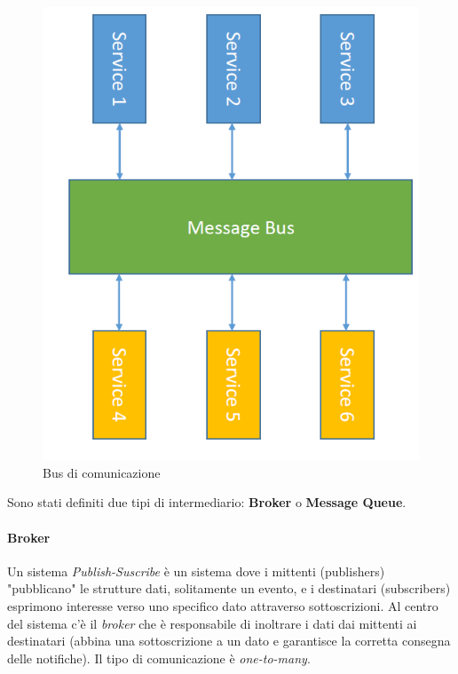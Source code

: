 \documentclass{article}
\begin{document}
\begin{figure}[H]
\centering
\includegraphics[scale=0.5]{img/Bus.PNG}
\caption{Bus di comunicazione}
\end{figure}

Sono stati definiti due tipi di intermediario: \textbf{Broker} o \textbf{Message Queue}.
\paragraph{Broker} 
Un sistema \textit{Publish-Suscribe} è un sistema dove i mittenti (publishers) "pubblicano" le strutture dati, solitamente un evento, e i destinatari (subscribers) esprimono interesse verso uno specifico dato attraverso sottoscrizioni. Al centro del sistema c'è il \textit{broker} che è responsabile di inoltrare i dati dai mittenti ai destinatari (abbina una sottoscrizione a un dato e garantisce la corretta consegna delle notifiche). 
Il tipo di comunicazione è \textit{one-to-many}.
\end{document}
